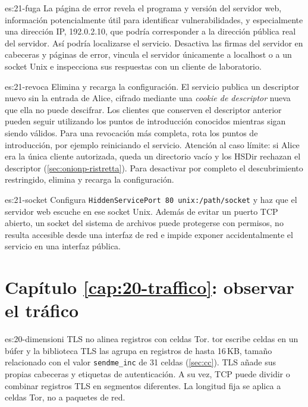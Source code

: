 \begin{soluzione}{es:21-fuga}
La página de error revela el programa y versión del servidor web, información potencialmente útil para identificar vulnerabilidades, y especialmente una dirección IP, 192.0.2.10, que podría corresponder a la dirección pública real del servidor. Así podría localizarse el servicio. Desactiva las firmas del servidor en cabeceras y páginas de error, vincula el servidor únicamente a localhost o a un socket Unix e inspecciona sus respuestas con un cliente de laboratorio.
\end{soluzione}

\begin{soluzione}{es:21-revoca}
Elimina  y recarga la configuración. El servicio publica un descriptor nuevo sin la entrada de Alice, cifrado mediante una \emph{cookie de descriptor} nueva que ella no puede descifrar. Los clientes que conserven el descriptor anterior pueden seguir utilizando los puntos de introducción conocidos mientras sigan siendo válidos. Para una revocación más completa, rota los puntos de introducción, por ejemplo reiniciando el servicio. Atención al caso límite: si Alice era la única cliente autorizada, queda un directorio vacío y los HSDir rechazan el descriptor (\cref{sec:onionp-ristretta}). Para desactivar por completo el descubrimiento restringido, elimina  y recarga la configuración.
\end{soluzione}

\begin{soluzione}{es:21-socket}
Configura \texttt{HiddenServicePort 80 unix:/path/socket} y haz que el servidor web escuche en ese socket Unix. Además de evitar un puerto TCP abierto, un socket del sistema de archivos puede protegerse con permisos, no resulta accesible desde una interfaz de red e impide exponer accidentalmente el servicio en una interfaz pública.
\end{soluzione}

\section*{Capítulo \ref{cap:20-traffico}: observar el tráfico}

\begin{soluzione}{es:20-dimensioni}
TLS no alinea registros con celdas Tor. tor escribe celdas en un búfer y la biblioteca TLS las agrupa en registros de hasta 16\,KB, tamaño relacionado con el valor \texttt{sendme\_inc} de 31 celdas (\cref{sec:cc}). TLS añade sus propias cabeceras y etiquetas de autenticación. A su vez, TCP puede dividir o combinar registros TLS en segmentos diferentes. La longitud fija se aplica a celdas Tor, no a paquetes de red.
\end{soluzione}

